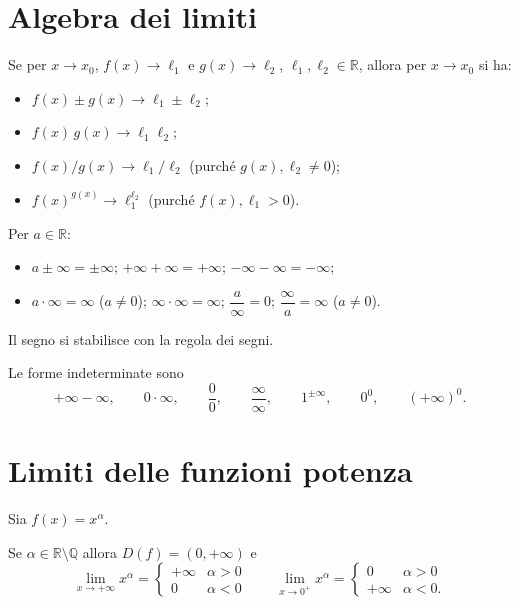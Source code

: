 \documentclass[11pt,a4paper]{article}
\begin{document}
\section{Algebra dei limiti}

\begin{teorema}
Se per $x \to x_0$, $f(x) \to \ell_1$ e $g(x) \to \ell_2$, $\ell_1, \ell_2 \in \mathbb{R}$, allora per $x \to x_0$ si ha:
\begin{itemize}
    \item $f(x) \pm g(x) \to \ell_1 \pm \ell_2$;
    \item $f(x)\,g(x) \to \ell_1 \ell_2$;
    \item $f(x)/g(x) \to \ell_1/\ell_2$ (purché $g(x), \ell_2 \neq 0$);
    \item $f(x)^{g(x)} \to \ell_1^{\ell_2}$ (purché $f(x), \ell_1 > 0$).
\end{itemize}
\end{teorema}

\begin{proprieta}
Per $a \in \mathbb{R}$:
\begin{itemize}
    \item $a \pm \infty = \pm\infty$; \quad $+\infty + \infty = +\infty$; \quad $-\infty - \infty = -\infty$;
    \item $a \cdot \infty = \infty$ ($a \neq 0$); \quad $\infty\cdot\infty = \infty$; \quad $\dfrac{a}{\infty} = 0$; \quad $\dfrac{\infty}{a} = \infty$ ($a \neq 0$).
\end{itemize}
Il segno si stabilisce con la regola dei segni.
\end{proprieta}

\begin{definizione}
Le forme indeterminate sono
\[
+\infty - \infty, \qquad 0 \cdot \infty, \qquad \frac{0}{0}, \qquad \frac{\infty}{\infty}, \qquad 1^{\pm\infty}, \qquad 0^0, \qquad (+\infty)^0 .
\]
\end{definizione}

\section{Limiti delle funzioni potenza}

Sia $f(x) = x^\alpha$.

Se $\alpha \in \mathbb{R}\setminus\mathbb{Q}$ allora $D(f) = (0, +\infty)$ e
\[
\lim_{x\to+\infty} x^\alpha = \begin{cases} +\infty & \alpha > 0 \\ 0 & \alpha < 0 \end{cases}
\qquad
\lim_{x\to 0^+} x^\alpha = \begin{cases} 0 & \alpha > 0 \\ +\infty & \alpha < 0. \end{cases}
\]
\end{document}
